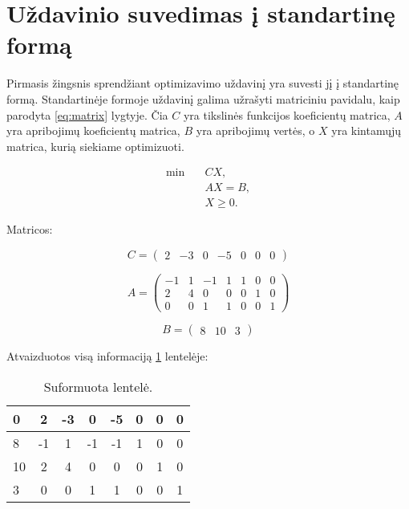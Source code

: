 \documentclass[a4paper,12pt,fleqn]{article}
\begin{document}
\pagebreak
\section{Uždavinio suvedimas į standartinę formą}

Pirmasis žingsnis sprendžiant optimizavimo uždavinį yra suvesti jį į standartinę formą. 
Standartinėje formoje uždavinį galima užrašyti matriciniu pavidalu, kaip parodyta \ref{eq:matrix} lygtyje. Čia $C$ yra tikslinės funkcijos koeficientų matrica, $A$ yra apribojimų koeficientų matrica, $B$ yra apribojimų vertės, o $X$ yra kintamųjų matrica, kurią siekiame optimizuoti.

\begin{equation} \label{eq:matrix}
\begin{aligned}
\min \quad & CX, \\
\quad & AX = B, \\
& X \geq 0.
\end{aligned}
\end{equation}

Matricos:

\begin{equation}
C = \begin{pmatrix}
2 & -3 & 0 & -5 & 0 & 0 & 0
\end{pmatrix}
\end{equation}

\begin{equation}
A = \begin{pmatrix}
-1 & 1 & -1 & 1 & 1 & 0 & 0 \\
2 & 4 & 0 & 0 & 0 & 1 & 0 \\
0 & 0 & 1 & 1 & 0 & 0 & 1
\end{pmatrix}
\end{equation}

\begin{equation}
B = \begin{pmatrix}
8 & 10 & 3
\end{pmatrix}
\end{equation}

Atvaizduotos visą informaciją \ref{tab:first-table} lentelėje:

\begin{table}[h!]
\centering
\caption{Suformuota lentelė.}
\label{tab:first-table}
\begin{tabular}{@{}lccccccc@{}}
\toprule
0 & 2 & -3 & 0 & -5 & 0 & 0 & 0 \\ \midrule
8 & -1 & 1 & -1 & -1 & 1 & 0 & 0 \\
10 & 2 & 4 & 0 & 0 & 0 & 1 & 0 \\
3 & 0 & 0 & 1 & 1 & 0 & 0 & 1 \\ \bottomrule
\end{tabular}
\end{table}
\end{document}

